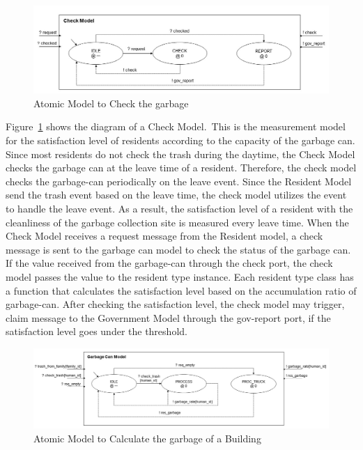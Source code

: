 \documentclass{scsSimAUDPaperFormat}
\begin{document}
\begin{figure}[!ht]
    \centering
    \includegraphics[width=1.0\columnwidth]{fig/check_model.jpg}
    \caption{Atomic Model to Check the garbage}
    \label{Fig:Checkmodel}
\end{figure}

Figure~\ref{Fig:Checkmodel} shows the diagram of a Check Model.~This is the measurement model for the satisfaction level of residents according to the capacity of the garbage can. Since most residents do not check the trash during the daytime, the Check Model checks the garbage can at the leave time of a resident. Therefore, the check model checks the garbage-can periodically on the leave event. Since the Resident Model send the trash event based on the leave time, the check model utilizes the event to handle the leave event. As a result, the satisfaction level of a resident with the cleanliness of the garbage collection site is measured every leave time. When the Check Model receives a request message from the Resident model, a check message is sent to the garbage can model to check the status of the garbage can. If the value received from the garbage-can through the check port, the check model passes the value to the resident type instance. Each resident type class has a function that calculates the satisfaction level based on the accumulation ratio of garbage-can. After checking the satisfaction level, the check model may trigger, claim message to the Government Model through the gov-report port, if the satisfaction level goes under the threshold.

\begin{figure}[!ht]
    \centering
    \includegraphics[width=1.0\columnwidth]{fig/garbagecan_model.jpg}
    \caption{Atomic Model to Calculate the garbage of a Building}
    \label{Fig:Garbagemodel}
\end{figure}
\end{document}
